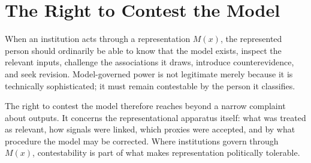 
\chapter{The Right to Contest the Model}
\label{ch:ch106}

When an institution acts through a representation \(M(x)\), the represented person should ordinarily be able to know that the model exists, inspect the relevant inputs, challenge the associations it draws, introduce counterevidence, and seek revision. Model-governed power is not legitimate merely because it is technically sophisticated; it must remain contestable by the person it classifies.

The right to contest the model therefore reaches beyond a narrow complaint about outputs. It concerns the representational apparatus itself: what was treated as relevant, how signals were linked, which proxies were accepted, and by what procedure the model may be corrected. Where institutions govern through \(M(x)\), contestability is part of what makes representation politically tolerable.
